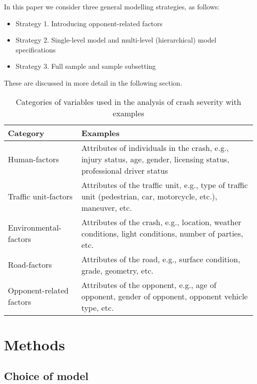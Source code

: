 \documentclass[]{elsarticle} %
\begin{document}
In this paper we consider three general modelling strategies, as
follows:

\begin{itemize}
\item
  Strategy 1. Introducing opponent-related factors
\item
  Strategy 2. Single-level model and multi-level (hierarchical) model
  specifications
\item
  Strategy 3. Full sample and sample subsetting
\end{itemize}

These are discussed in more detail in the following section.

\begin{table}

\caption{\label{tab:table-variable-categories}\label{tab:variable-categories}Categories of variables used in the analysis of crash severity with examples}
\centering
\fontsize{7}{9}\selectfont
\begin{tabular}[t]{l>{\raggedright\arraybackslash}p{22em}}
\toprule
Category & Examples\\
\midrule
Human-factors & Attributes of individuals in the crash, e.g., injury status, age, gender, licensing status, professional driver status\\
Traffic unit-factors & Attributes of the traffic unit, e.g., type of traffic unit (pedestrian, car, motorcycle, etc.), maneuver, etc.\\
Environmental-factors & Attributes of the crash, e.g., location, weather conditions, light conditions, number of parties, etc.\\
Road-factors & Attributes of the road, e.g., surface condition, grade, geometry, etc.\\
Opponent-related factors & Attributes of the opponent, e.g., age of opponent, gender of opponent, opponent vehicle type, etc.\\
\bottomrule
\end{tabular}
\end{table}

\hypertarget{sec:methods}{%
\section{Methods}\label{sec:methods}}

\hypertarget{choice-of-model}{%
\subsection{Choice of model}\label{choice-of-model}}
\end{document}

